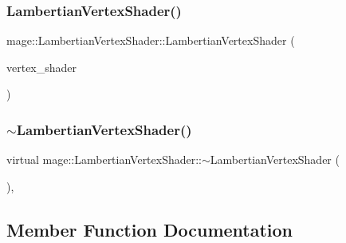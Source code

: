 \hypertarget{classmage_1_1_lambertian_vertex_shader_afd8f8b77d0e54df2241fe5f3f54205f4}{}\label{classmage_1_1_lambertian_vertex_shader_afd8f8b77d0e54df2241fe5f3f54205f4} 
\subsubsection{\texorpdfstring{Lambertian\+Vertex\+Shader()}{LambertianVertexShader()}\hspace{0.1cm}{\footnotesize\ttfamily [3/3]}}
{\footnotesize\ttfamily mage\+::\+Lambertian\+Vertex\+Shader\+::\+Lambertian\+Vertex\+Shader (\begin{DoxyParamCaption}\item[{\hyperlink{classmage_1_1_lambertian_vertex_shader}{Lambertian\+Vertex\+Shader} \&\&}]{vertex\+\_\+shader }\end{DoxyParamCaption})\hspace{0.3cm}{\ttfamily [default]}}

\hypertarget{classmage_1_1_lambertian_vertex_shader_a55636fd3817b97b6529690d6e3e5cd46}{}\label{classmage_1_1_lambertian_vertex_shader_a55636fd3817b97b6529690d6e3e5cd46} 
\subsubsection{\texorpdfstring{$\sim$\+Lambertian\+Vertex\+Shader()}{~LambertianVertexShader()}}
{\footnotesize\ttfamily virtual mage\+::\+Lambertian\+Vertex\+Shader\+::$\sim$\+Lambertian\+Vertex\+Shader (\begin{DoxyParamCaption}{ }\end{DoxyParamCaption})\hspace{0.3cm}{\ttfamily [virtual]}, {\ttfamily [default]}}



\subsection{Member Function Documentation}
\hypertarget{classmage_1_1_lambertian_vertex_shader_a974b43346ab5d8081d9101f715e7670d}{}\label{classmage_1_1_lambertian_vertex_shader_a974b43346ab5d8081d9101f715e7670d} 
